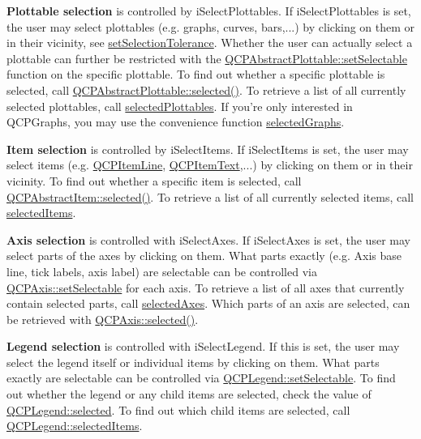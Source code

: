 {\bfseries Plottable selection} is controlled by i\+Select\+Plottables. If i\+Select\+Plottables is set, the user may select plottables (e.\+g. graphs, curves, bars,...) by clicking on them or in their vicinity, see \hyperlink{a00116_a4dc31241d7b09680950e19e5f971ed93}{set\+Selection\+Tolerance}. Whether the user can actually select a plottable can further be restricted with the \hyperlink{a00024_a22c69299eb5569e0f6bf084877a37dc4}{Q\+C\+P\+Abstract\+Plottable\+::set\+Selectable} function on the specific plottable. To find out whether a specific plottable is selected, call \hyperlink{a00024_ab901903adcb0e29467d63de72340ab29}{Q\+C\+P\+Abstract\+Plottable\+::selected()}. To retrieve a list of all currently selected plottables, call \hyperlink{a00116_a6721b8c689bb7f2f400987e580508fe8}{selected\+Plottables}. If you're only interested in Q\+C\+P\+Graphs, you may use the convenience function \hyperlink{a00116_ad2a0493bdd01e7aa99a4209ae3a5b67b}{selected\+Graphs}.

{\bfseries Item selection} is controlled by i\+Select\+Items. If i\+Select\+Items is set, the user may select items (e.\+g. \hyperlink{a00036}{Q\+C\+P\+Item\+Line}, \hyperlink{a00041}{Q\+C\+P\+Item\+Text},...) by clicking on them or in their vicinity. To find out whether a specific item is selected, call \hyperlink{a00022_a225865808640d8d9a7dd19f09a2e93f2}{Q\+C\+P\+Abstract\+Item\+::selected()}. To retrieve a list of all currently selected items, call \hyperlink{a00116_a3714adb0a26b8cf1bd70740a7ea464c4}{selected\+Items}.

{\bfseries Axis selection} is controlled with i\+Select\+Axes. If i\+Select\+Axes is set, the user may select parts of the axes by clicking on them. What parts exactly (e.\+g. Axis base line, tick labels, axis label) are selectable can be controlled via \hyperlink{a00025_afa988209bf6519f63d6ef2e615dbe1ea}{Q\+C\+P\+Axis\+::set\+Selectable} for each axis. To retrieve a list of all axes that currently contain selected parts, call \hyperlink{a00116_aa6baf867e8beb96ed5bd471f83ece903}{selected\+Axes}. Which parts of an axis are selected, can be retrieved with \hyperlink{a00025_a534509949b91a6aa08e38cca48b62c9e}{Q\+C\+P\+Axis\+::selected()}.

{\bfseries Legend selection} is controlled with i\+Select\+Legend. If this is set, the user may select the legend itself or individual items by clicking on them. What parts exactly are selectable can be controlled via \hyperlink{a00045_aae042f6211e39305d13f7b18c1c301d9}{Q\+C\+P\+Legend\+::set\+Selectable}. To find out whether the legend or any child items are selected, check the value of \hyperlink{a00045_a10948e896935ad14f374e6f712afaae9}{Q\+C\+P\+Legend\+::selected}. To find out which child items are selected, call \hyperlink{a00045_ac93eaf236e911d67aa8b88942ef45c5e}{Q\+C\+P\+Legend\+::selected\+Items}.


